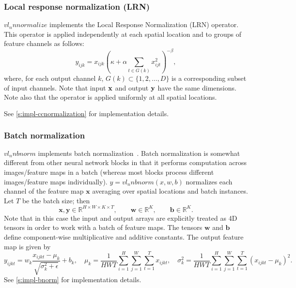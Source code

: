 \subsubsection{Local response normalization (LRN)}\label{s:ccnormalization}

$vl_nnnormalize$ implements the Local Response Normalization (LRN) operator. This operator is applied independently at each spatial location and to groups of feature channels as follows:
\[
y_{ijk} = x_{ijk} \left( \kappa + \alpha \sum_{t\in G(k)} x_{ijt}^2 \right)^{-\beta},
\]
where, for each output channel $k$, $G(k) \subset \{1, 2, \dots, D\}$ is a corresponding subset of input channels. Note that input $\mathbf{x}$ and output $\mathbf{y}$ have the same dimensions. Note also that the operator is applied uniformly at all spatial locations.

See \cref{s:impl-ccnormalization} for implementation details.

\subsubsection{Batch normalization}\label{s:bnorm}

$vl_nnbnorm$ implements batch normalization~\cite{ioffe2015}. Batch normalization is somewhat different from other neural network blocks in that it performs computation across images/feature maps in a batch (whereas most blocks process different images/feature maps individually). $y = vl_nnbnorm(x, w, b)$ normalizes each channel of the feature map $\mathbf{x}$ averaging over spatial locations and batch instances. Let $T$ be the batch size; then
\[
\mathbf{x}, \mathbf{y} \in \mathbb{R}^{H \times W \times K \times T},
\qquad\mathbf{w} \in \mathbb{R}^{K},
\qquad\mathbf{b} \in \mathbb{R}^{K}.
\]
Note that in this case the input and output arrays are explicitly treated as 4D tensors in order to work with a batch of feature maps. The tensors  $\mathbf{w}$ and $\mathbf{b}$ define component-wise multiplicative and additive constants. The output feature map is given by
\[
y_{ijkt} = w_k \frac{x_{ijkt} - \mu_{k}}{\sqrt{\sigma_k^2 + \epsilon}} + b_k,
\quad
\mu_{k} = \frac{1}{HWT}\sum_{i=1}^H \sum_{j=1}^W \sum_{t=1}^{T} x_{ijkt},
\quad
\sigma^2_{k} = \frac{1}{HWT}\sum_{i=1}^H \sum_{j=1}^W \sum_{t=1}^{T} (x_{ijkt} - \mu_{k})^2.
\]
See \cref{s:impl-bnorm} for implementation details.

